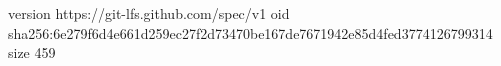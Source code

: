 version https://git-lfs.github.com/spec/v1
oid sha256:6e279f6d4e661d259ec27f2d73470be167de7671942e85d4fed3774126799314
size 459
